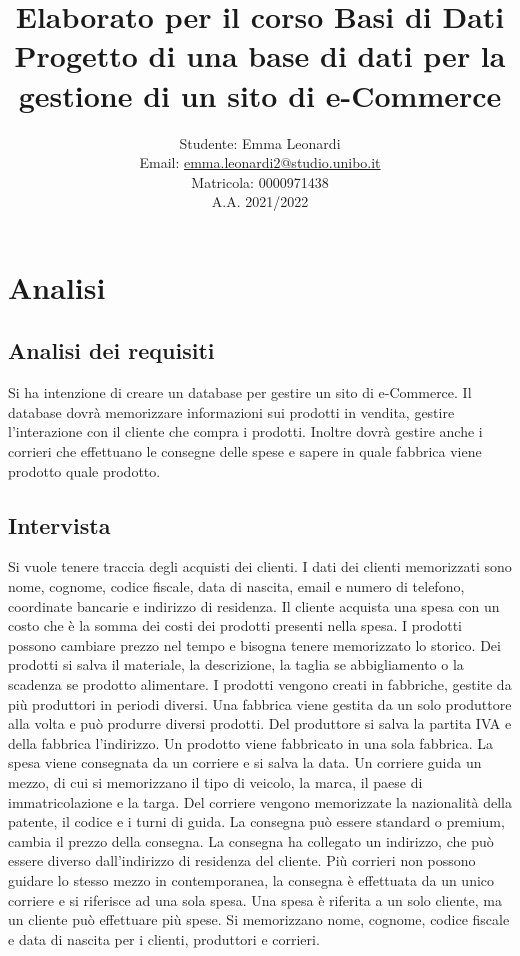 \documentclass[a4paper,12pt]{report}
\title{Elaborato per il corso Basi di Dati\\ \small Progetto di una base di dati per la gestione di un sito di e-Commerce}
\author{
    Studente: Emma Leonardi\\
    Email: \url{emma.leonardi2@studio.unibo.it}\\
    Matricola: 0000971438\\
    A.A. 2021/2022
    }
\date{}
\begin{document}
\maketitle
\tableofcontents

\chapter{Analisi}
\section{Analisi dei requisiti}
Si ha intenzione di creare un database per gestire un sito di e-Commerce.
Il database dovrà memorizzare informazioni sui prodotti in vendita, gestire l'interazione con il cliente che compra i prodotti. 
Inoltre dovrà gestire anche i corrieri che effettuano le consegne delle spese e sapere in quale fabbrica viene prodotto quale prodotto.
\section{Intervista}
Si vuole tenere traccia degli acquisti dei clienti. I dati dei clienti memorizzati sono nome, cognome, codice fiscale, data di nascita, 
email e numero di telefono, coordinate bancarie e indirizzo di residenza.
Il cliente acquista una spesa con un costo che è la somma dei costi dei prodotti presenti nella spesa. 
I prodotti possono cambiare prezzo nel tempo e bisogna tenere memorizzato lo storico. 
Dei prodotti si salva il materiale, la descrizione, la taglia se abbigliamento o la scadenza se prodotto alimentare. 
I prodotti vengono creati in fabbriche, gestite da più produttori in periodi diversi. Una fabbrica viene gestita da un solo produttore alla volta e può produrre diversi prodotti. 
Del produttore si salva la partita IVA e della fabbrica l'indirizzo. Un prodotto viene fabbricato in una sola fabbrica.
La spesa viene consegnata da un corriere e si salva la data. Un corriere guida un mezzo, di cui si memorizzano il tipo di veicolo, la marca, il paese di immatricolazione e la targa.
Del corriere vengono memorizzate la nazionalità della patente, il codice e i turni di guida. La consegna può essere standard o premium, cambia il prezzo della consegna.
La consegna ha collegato un indirizzo, che può essere diverso dall'indirizzo di residenza del cliente. Più corrieri non possono guidare lo stesso mezzo in contemporanea, la consegna è effettuata da un unico corriere 
e si riferisce ad una sola spesa. Una spesa è riferita a un solo cliente, ma un cliente può effettuare più spese. 
Si memorizzano nome, cognome, codice fiscale e data di nascita per i clienti, produttori e corrieri.
\end{document}
